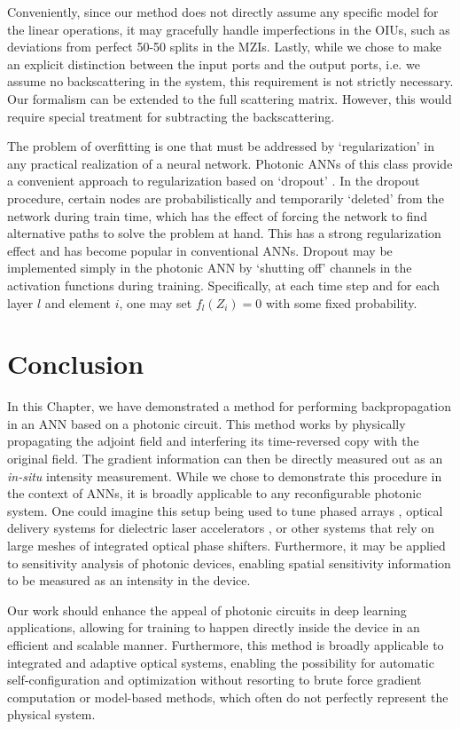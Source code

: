 Conveniently, since our method does not directly assume any specific model for the linear operations, it may gracefully handle imperfections in the OIUs, such as deviations from perfect 50-50 splits in the MZIs.  Lastly, while we chose to make an explicit distinction between the input ports and the output ports, i.e. we assume no backscattering in the system, this requirement is not strictly necessary. Our formalism can be extended to the full scattering matrix.  However, this would require special treatment for subtracting the backscattering. 

The problem of overfitting is one that must be addressed by `regularization' in any practical realization of a neural network.  Photonic ANNs of this class provide a convenient approach to regularization based on `dropout' \cite{srivastava2014dropout}.  In the dropout procedure, certain nodes are probabilistically and temporarily `deleted’ from the network during train time, which has the effect of forcing the network to find alternative paths to solve the problem at hand.  This has a strong regularization effect and has become popular in conventional ANNs.  Dropout may be implemented simply in the photonic ANN by `shutting off’ channels in the activation functions during training.  Specifically, at each time step and for each layer $l$ and element $i$, one may set $f_l(Z_i) = 0$ with some fixed probability.


\section{Conclusion}

In this Chapter, we have demonstrated a method for performing backpropagation in an ANN based on a photonic circuit.  This method works by physically propagating the adjoint field and interfering its time-reversed copy with the original field.  The gradient information can then be directly measured out as an \textit{in-situ} intensity measurement. While we chose to demonstrate this procedure in the context of ANNs, it is broadly applicable to any reconfigurable photonic system.  One could imagine this setup being used to tune phased arrays \cite{sun2013large}, optical delivery systems for dielectric laser accelerators \cite{hughes2017chip}, or other systems that rely on large meshes of integrated optical phase shifters.  Furthermore, it may be applied to sensitivity analysis of photonic devices, enabling spatial sensitivity information to be measured as an intensity in the device.

Our work should enhance the appeal of photonic circuits in deep learning applications, allowing for training to happen directly inside the device in an efficient and scalable manner.  Furthermore, this method is broadly applicable to integrated and adaptive optical systems, enabling the possibility for automatic self-configuration and optimization without resorting to brute force gradient computation or model-based methods, which often do not perfectly represent the physical system.
